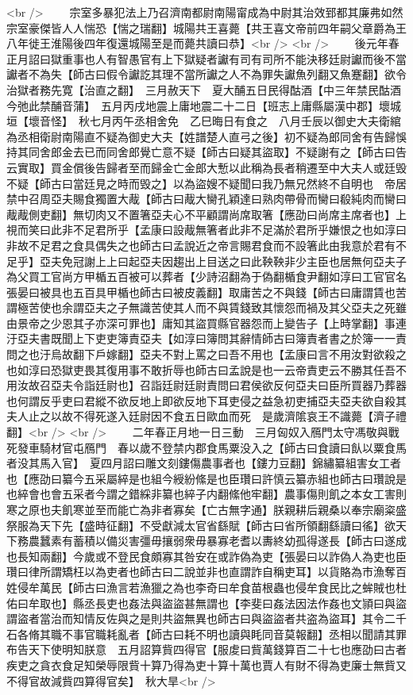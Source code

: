<br />
　　宗室多暴犯法上乃召濟南都尉南陽甯成為中尉其治效郅都其廉弗如然宗室豪傑皆人人惴恐【惴之瑞翻】城陽共王喜薨【共王喜文帝前四年嗣父章爵為王八年徙王淮陽後四年復還城陽至是而薨共讀曰恭】<br />
<br />
　　後元年春正月詔曰獄重事也人有智愚官有上下獄疑者讞有司有司所不能決移廷尉讞而後不當讞者不為失【師古曰假令讞訖其理不當所讞之人不為罪失讞魚列翻又魚蹇翻】欲令治獄者務先寛【治直之翻】　三月赦天下　夏大酺五日民得酤酒【中三年禁民酤酒今弛此禁酺音蒲】　五月丙戌地震上庸地震二十二日【班志上庸縣屬漢中郡】壞城垣【壞音怪】　秋七月丙午丞相舍免　乙巳晦日有食之　八月壬辰以御史大夫衛綰為丞相衛尉南陽直不疑為御史大夫【姓譜楚人直弓之後】初不疑為郎同舍有告歸悞持其同舍郎金去已而同舍郎覺亡意不疑【師古曰疑其盜取】不疑謝有之【師古曰告云實取】買金償後告歸者至而歸金亡金郎大慙以此稱為長者稍遷至中大夫人或廷毁不疑【師古曰當廷見之時而毁之】以為盜嫂不疑聞曰我乃無兄然終不自明也　帝居禁中召周亞夫賜食獨置大胾【師古曰胾大臠孔穎達曰熟肉帶骨而臠曰殽純肉而臠曰胾胾側吏翻】無切肉又不置箸亞夫心不平顧謂尚席取箸【應劭曰尚席主席者也】上視而笑曰此非不足君所乎【孟康曰設胾無箸者此非不足滿於君所乎嫌恨之也如淳曰非故不足君之食具偶失之也師古曰孟說近之帝言賜君食而不設箸此由我意於君有不足乎】亞夫免冠謝上上曰起亞夫因趨出上目送之曰此鞅鞅非少主臣也居無何亞夫子為父買工官尚方甲楯五百被可以葬者【少詩沼翻為于偽翻楯食尹翻如淳曰工官官名張晏曰被具也五百具甲楯也師古曰被皮義翻】取庸苦之不與錢【師古曰庸謂賃也苦謂極苦使也余謂亞夫之子無識苦使其人而不與賃錢致其懷怨而禍及其父亞夫之死雖由景帝之少恩其子亦深可罪也】庸知其盜買縣官器怨而上變告子【上時掌翻】事連汙亞夫書既聞上下吏吏簿責亞夫【如淳曰簿問其辭情師古曰簿責者書之於簿一一責問之也汙烏故翻下戶嫁翻】亞夫不對上罵之曰吾不用也【孟康曰言不用汝對欲殺之也如淳曰恐獄吏畏其復用事不敢折辱也師古曰孟說是也一云帝責吏云不勝其任吾不用汝故召亞夫令詣廷尉也】召詣廷尉廷尉責問曰君侯欲反何亞夫曰臣所買器乃葬器也何謂反乎吏曰君縱不欲反地上即欲反地下耳吏侵之益急初吏捕亞夫亞夫欲自殺其夫人止之以故不得死遂入廷尉因不食五日歐血而死　是歲濟隂哀王不識薨【濟子禮翻】<br />
<br />
　　二年春正月地一日三動　三月匈奴入鴈門太守馮敬與戰死發車騎材官屯鴈門　春以歲不登禁内郡食馬粟没入之【師古曰食讀曰飤以粟食馬者没其馬入官】　夏四月詔曰雕文刻鏤傷農事者也【鏤力豆翻】錦繡纂組害女工者也【應劭曰纂今五采屬綷是也組今綬紛絛是也臣瓚曰許慎云纂赤組也師古曰瓚說是也綷會也會五采者今謂之錯綵非纂也綷子内翻絛他牢翻】農事傷則飢之本女工害則寒之原也夫飢寒並至而能亡為非者寡矣【亡古無字通】朕親耕后親桑以奉宗廟粢盛祭服為天下先【盛時征翻】不受獻減太官省繇賦【師古曰省所領翻繇讀曰徭】欲天下務農蠶素有蓄積以備災害彊毋攘弱衆毋暴寡老耆以夀終幼孤得遂長【師古曰遂成也長知兩翻】今歲或不登民食頗寡其咎安在或詐偽為吏【張晏曰以詐偽人為吏也臣瓚曰律所謂矯枉以為吏者也師古曰二說並非也直謂詐自稱吏耳】以貨賂為市漁奪百姓侵牟萬民【師古曰漁言若漁獵之為也李奇曰牟食苗根蟲也侵牟食民比之蛑賊也杜佑曰牟取也】縣丞長吏也姦法與盜盜甚無謂也【李斐曰姦法因法作姦也文頴曰與盜謂盜者當治而知情反佐與之是則共盜無異也師古曰與盜盜者共盗為盜耳】其令二千石各脩其職不事官職耗亂者【師古曰耗不明也讀與眊同音莫報翻】丞相以聞請其罪布告天下使明知朕意　五月詔算貲四得官【服䖍曰貲萬錢算百二十七也應劭曰古者疾吏之貪衣食足知榮辱限貲十算乃得為吏十算十萬也賈人有財不得為吏廉士無貲又不得官故減貲四算得官矣】　秋大旱<br />
